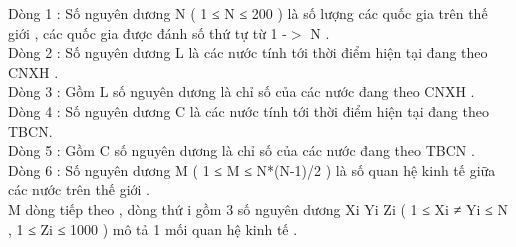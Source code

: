 Dòng 1 : Số nguyên dương N ( 1 ≤ N ≤ 200 ) là số lượng các quốc gia trên thế giới , các quốc gia được đánh số thứ tự từ 1 -$>$ N .   
\\   Dòng 2 : Số nguyên dương L là các nước tính tới thời điểm hiện tại đang theo CNXH .   
\\   Dòng 3 : Gồm L số nguyên dương là chỉ số của các nước đang theo CNXH .   
\\   Dòng 4 : Số nguyên dương C là các nước tính tới thời điểm hiện tại đang theo TBCN.   
\\   Dòng 5 : Gồm C số nguyên dương là chỉ số của các nước đang theo TBCN .   
\\   Dòng 6 : Số nguyên dương M ( 1 ≤ M ≤ N*(N-1)/2 ) là số quan hệ kinh tế giữa các nước trên thế giới .   
\\   M dòng tiếp theo , dòng thứ i gồm 3 số nguyên dương Xi Yi Zi ( 1 ≤ Xi ≠ Yi ≤ N , 1 ≤ Zi ≤ 1000 ) mô tả 1 mối quan hệ kinh tế .